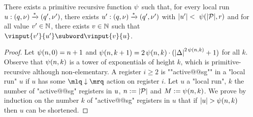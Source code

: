 \begin{lemma}
\label{lem:towerbound_signature}
There exists a primitive recursive function $\psi$ such that, for every local run $u: (q,\nu) \xrightarrow{*} (q', \nu')$, there exists $u' : (q,\nu) \xrightarrow{*} (q',\nu')$ with $|u'| <~\psi(|\mathcal{P}|,r)$ and for all value $v' \in \mathbb{N}$, there exists $v \in \mathbb{N}$ such that  $\vinput{v'}{u'} \subword \vinput{v}{u}$. 
\end{lemma}
\begin{proof}
Let $\psi(n,0) = n+1$ and $\psi(n,k+1) = 2 \, \psi(n,k) \cdot ({|\Delta|}^{2\,\psi(n,k)}+1)$ for all $k$. Observe that $\psi(n,k)$ is a tower of exponentials of height $k$, which is primitive-recursive although non-elementary. A register $i \geq 2$ is ""active@@sg"" in a "local run" $u$ if $u$ has some $\quotemarks{\enregact}$ action on register $i$. Let $u$ a "local run", $k$ the number of "active@@sg" registers in $u$, $n := |\mathcal{P}|$ and $M := \psi(n,k)$.
We prove by induction on the number $k$ of "active@@sg" registers in $u$  that if $|u| >\psi(n,k)$ then $u$ can be shortened. 
 


\end{proof}
